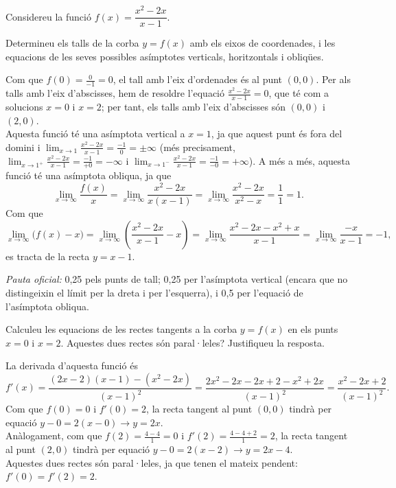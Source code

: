Considereu la funció $f(x)=\dfrac{x^2-2x}{x-1}$.

\begin{apartats}

Determineu els talls de la corba $y=f(x)$ amb els eixos de coordenades, i les equacions de les seves
possibles asímptotes verticals, horitzontals i obliqües.

\begin{solucio}
Com que $f(0)=\frac{0}{-1}=0$, el tall amb l'eix d'ordenades és al punt $(0,0)$. Per als talls amb l'eix
d'abscisses, hem de resoldre l'equació $\frac{x^2-2x}{x-1}=0$, que té com a solucions $x=0$ i $x=2$; per
tant, els talls amb l'eix d'abscisses són $(0,0)$ i $(2,0)$.\\
Aquesta funció té una asímptota vertical a $x=1$, ja que aquest punt és fora del domini i
$\lim_{x\to1}\frac{x^2-2x}{x-1}=\frac{-1}{0}=\pm\infty$ (més precisament,
$\lim_{x\to1^+}\frac{x^2-2x}{x-1}=\frac{-1}{+0}=-\infty$ i $\lim_{x\to1^-}\frac{x^2-2x}{x-1}=\frac{-1}{-0}=+\infty$).
A més a més, aquesta funció té una asímptota obliqua, ja que
\[
\lim_{x\to\infty}\frac{f(x)}{x}=\lim_{x\to\infty}\frac{x^2-2x}{x(x-1)}=\lim_{x\to\infty}\frac{x^2-2x}{x^2-x}=\frac11=1 .
\]
Com que
\[
\lim_{x\to\infty}\bigl(f(x)-x\bigr)=\lim_{x\to\infty}\left(\frac{x^2-2x}{x-1}-x\right)
=\lim_{x\to\infty}\frac{x^2-2x-x^2+x}{x-1}=\lim_{x\to\infty}\frac{-x}{x-1}=-1,
\]
es tracta de la recta $y=x-1$.

\textit{Pauta oficial:} 0,25 pels punts de tall; 0,25 per l'asímptota vertical (encara que no distingeixin el
límit per la dreta i per l'esquerra), i 0,5 per l'equació de l'asímptota obliqua.
\end{solucio}

Calculeu les equacions de les rectes tangents a la corba $y=f(x)$ en els punts $x=0$ i $x=2$. Aquestes dues
rectes són paral·leles? Justifiqueu la resposta.

\begin{solucio}
La derivada d'aquesta funció és
\[
f'(x)=\frac{(2x-2)(x-1)-\left(x^2-2x\right)}{(x-1)^2}=\frac{2x^2-2x-2x+2-x^2+2x}{(x-1)^2}=\frac{x^2-2x+2}{(x-1)^2}.
\]
Com que $f(0)=0$ i $f'(0)=2$, la recta tangent al punt $(0,0)$ tindrà per equació $y-0=2(x-0)\rightarrow y=2x$.\\
Anàlogament, com que $f(2)=\frac{4-4}{1}=0$ i $f'(2)=\frac{4-4+2}{1}=2$, la recta tangent al punt $(2,0)$
tindrà per equació $y-0=2(x-2)\rightarrow y=2x-4$.\\
Aquestes dues rectes són paral·leles, ja que tenen el mateix pendent: $f'(0)=f'(2)=2$.


\end{solucio}
\end{apartats}
